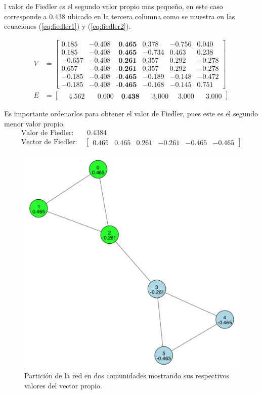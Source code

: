 \documentclass[letterpaper]{article}
\begin{document}
l valor de Fiedler es el segundo valor propio mas pequeño, en este caso corresponde a 0.438 ubicado en la tercera columna como se muestra en las ecuaciones (\ref{eq:fiedler1}) y (\ref{eq:fiedler2}).


\begin{align}
  V &= \begin{bmatrix}
     0.185 & -0.408 & \textbf{ 0.465} &  0.378 & -0.756 &  0.040 \\
     0.185 & -0.408 & \textbf{ 0.465} & -0.734 &  0.463 &  0.238 \\
    -0.657 & -0.408 & \textbf{ 0.261} &  0.357 &  0.292 & -0.278 \\
     0.657 & -0.408 & \textbf{-0.261} &  0.357 &  0.292 & -0.278 \\
    -0.185 & -0.408 & \textbf{-0.465} & -0.189 & -0.148 & -0.472 \\
    -0.185 & -0.408 & \textbf{-0.465} & -0.168 & -0.145 &  0.751
  \end{bmatrix} \label{eq:fiedler1}\\
  E &= \begin{bmatrix} \quad 4.562 & \quad 0.000 & \; \textbf{0.438} & \quad 3.000 & \; \; 3.000 & \;\;\; 3.000 \end{bmatrix} \label{eq:fiedler2}
\end{align}

Es importante ordenarlos para obtener el valor de Fiedler, pues este es el segundo menor valor propio.
\begin{align}
  \text{Valor de Fiedler: }  & \; 0.4384\\
  \text{Vector de Fiedler: } & \begin{bmatrix}0.465 & 0.465 & 0.261 & -0.261 & -0.465 & -0.465\end{bmatrix}
\end{align}


\begin{figure}[H]
  \centering
  \includegraphics[width=.7\linewidth]{img/p2.png}
  \caption{Partición de la red en dos comunidades mostrando sus respectivos valores del vector propio.}
  \label{red:2}
\end{figure}
\end{document}
